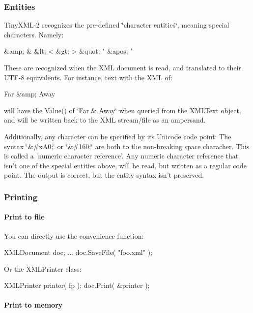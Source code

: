 \subsubsection*{Entities}

Tiny\+X\+M\+L-\/2 recognizes the pre-\/defined \char`\"{}character entities\char`\"{}, meaning special characters. Namely\+: \begin{DoxyVerb}&amp;   &
&lt;    <
&gt;    >
&quot;  "
&apos;  '
\end{DoxyVerb}


These are recognized when the X\+M\+L document is read, and translated to their U\+T\+F-\/8 equivalents. For instance, text with the X\+M\+L of\+: \begin{DoxyVerb}Far &amp; Away
\end{DoxyVerb}


will have the Value() of \char`\"{}\+Far \& Away\char`\"{} when queried from the X\+M\+L\+Text object, and will be written back to the X\+M\+L stream/file as an ampersand.

Additionally, any character can be specified by its Unicode code point\+: The syntax \char`\"{}\&\#x\+A0;\char`\"{} or \char`\"{}\&\#160;\char`\"{} are both to the non-\/breaking space characher. This is called a 'numeric character reference'. Any numeric character reference that isn't one of the special entities above, will be read, but written as a regular code point. The output is correct, but the entity syntax isn't preserved.

\subsubsection*{Printing}

\paragraph*{Print to file}

You can directly use the convenience function\+: \begin{DoxyVerb}XMLDocument doc;
...
doc.SaveFile( "foo.xml" );
\end{DoxyVerb}


Or the X\+M\+L\+Printer class\+: \begin{DoxyVerb}XMLPrinter printer( fp );
doc.Print( &printer );
\end{DoxyVerb}


\paragraph*{Print to memory}

